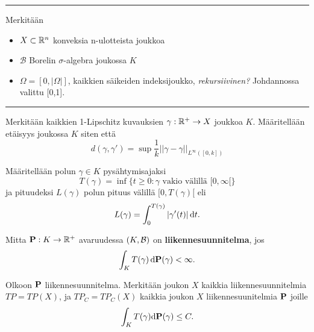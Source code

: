 

\hrule
Merkitään 
\begin{itemize}
    \item{$X\subset \R^n$ konveksia n-ulotteista joukkoa}
    \item $\mathcal{B}$ Borelin $\sigma$-algebra joukossa $K$
    \item $\Omega = [0,|\Omega|]$, kaikkien säikeiden indeksijoukko, \textit{rekursiivinen?} Johdannossa valittu [0,1].
\end{itemize}
\hrule

\begin{definition}
    Merkitään kaikkien 1-Lipschitz kuvauksien $\gamma:\R^+ \to X$ joukkoa $K$. Määritellään etäisyys joukossa $K$ siten että
    \[d(\gamma, \gamma') = \sup \frac{1}{k}||\gamma - \gamma||_{L^\infty([0,k])}\]
\end{definition}

\begin{definition}
    Määritellään polun $\gamma \in K$ pysähtymisajaksi 
    \begin{equation*}
        T(\gamma) = \inf\{t\ge0:\gamma \text{ vakio välillä } [0,\infty[ \}
    \end{equation*}
    ja pituudeksi $L(\gamma)$ polun pituus välillä $[0, T(\gamma)[$ eli
     \begin{equation*}
         L(\gamma) = \int_0^{T(\gamma)}|\gamma'(t)|\, \dt.
     \end{equation*}
    
\end{definition}

\begin{definition}
    Mitta $\P: K \to \R^+$ avaruudessa  $(K, \Borel)$ on \textbf{liikennesuunnitelma}, jos
    \begin{equation*}
     \int_K T(\gamma) \, \d \P (\gamma) < \infty.   
    \end{equation*}
\end{definition}

\begin{definition}
    Olkoon $\P$ liikennesuunnitelma. Merkitään joukon $X$ kaikkia liikennesuunnitelmia $TP = TP(X)$, ja $TP_C = TP_C(X)$ kaikkia joukon $X$ liikennesuunitelmia $\P$ joille
    \begin{equation*}
        \int_K T(\gamma) \d \P(\gamma) \le C.
    \end{equation*}
\end{definition}

